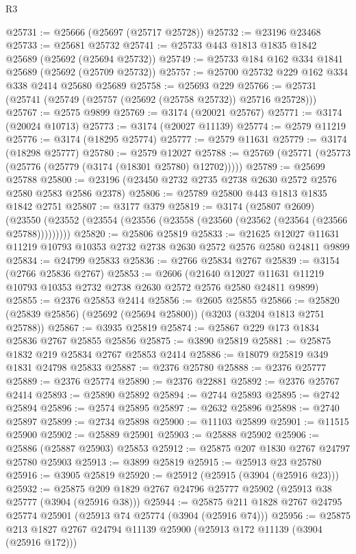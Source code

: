 \begin{lexlean}{R3}
\begin{coremodule}
@25731 := @25666 (@25697 (@25717 @25728))
@25732 := @23196 @23468
@25733 := @25681 @25732
@25741 := @25733 @443 @1813 @1835 @1842 @25689 (@25692 (@25694 @25732))
@25749 := @25733 @184 @162 @334 @1841 @25689 (@25692 (@25709 @25732))
@25757 := @25700 @25732 @229 @162 @334 @338 @2414 @25680 @25689
@25758 := @25693 @229
@25766 := @25731 (@25741 (@25749 (@25757 (@25692 (@25758 @25732)) @25716 @25728)))
@25767 := @2575 @9899
@25769 := @3174 (@20021 @25767)
@25771 := @3174 (@20024 @10713)
@25773 := @3174 (@20027 @11139)
@25774 := @2579 @11219
@25776 := @3174 (@18295 @25774)
@25777 := @2579 @11631
@25779 := @3174 (@18298 @25777)
@25780 := @2579 @12027
@25788 := @25769 (@25771 (@25773 (@25776 (@25779 (@3174 (@18301 @25780) @12702)))))
@25789 := @25699 @25788
@25800 := @23196 (@23450 @2732 @2735 @2738 @2630 @2572 @2576 @2580 @2583 @2586 @2378)
@25806 := @25789 @25800 @443 @1813 @1835 @1842 @2751
@25807 := @3177 @379
@25819 := @3174
    (@25807 @2609)
    (@23550 (@23552 (@23554 (@23556 (@23558 (@23560 (@23562 (@23564 (@23566 @25788)))))))))
@25820 := @25806 @25819
@25833 := @21625 @12027 @11631 @11219 @10793 @10353 @2732 @2738 @2630 @2572 @2576 @2580 @24811 @9899
@25834 := @24799 @25833
@25836 := @2766 @25834 @2767
@25839 := @3154 (@2766 @25836 @2767)
@25853 := @2606
    (@21640 @12027 @11631 @11219 @10793 @10353 @2732 @2738 @2630 @2572 @2576 @2580 @24811 @9899)
@25855 := @2376 @25853 @2414
@25856 := @2605 @25855
@25866 := @25820 (@25839 @25856) (@25692 (@25694 @25800)) (@3203 (@3204 @1813 @2751 @25788))
@25867 := @3935 @25819
@25874 := @25867 @229 @173 @1834 @25836 @2767 @25855 @25856
@25875 := @3890 @25819
@25881 := @25875 @1832 @219 @25834 @2767 @25853 @2414
@25886 := @18079 @25819 @349 @1831 @24798 @25833
@25887 := @2376 @25780
@25888 := @2376 @25777
@25889 := @2376 @25774
@25890 := @2376 @22881
@25892 := @2376 @25767 @2414
@25893 := @25890 @25892
@25894 := @2744 @25893
@25895 := @2742 @25894
@25896 := @2574 @25895
@25897 := @2632 @25896
@25898 := @2740 @25897
@25899 := @2734 @25898
@25900 := @11103 @25899
@25901 := @11515 @25900
@25902 := @25889 @25901
@25903 := @25888 @25902
@25906 := @25886 (@25887 @25903) @25853
@25912 := @25875 @207 @1830 @2767 @24797 @25780 @25903
@25913 := @3899 @25819
@25915 := @25913 @23 @25780
@25916 := @3905 @25819
@25920 := @25912 (@25915 (@3904 (@25916 @23)))
@25932 := @25875 @209 @1829 @2767 @24796 @25777 @25902 (@25913 @38 @25777 (@3904 (@25916 @38)))
@25944 := @25875 @211 @1828 @2767 @24795 @25774 @25901 (@25913 @74 @25774 (@3904 (@25916 @74)))
@25956 := @25875 @213 @1827 @2767 @24794 @11139 @25900 (@25913 @172 @11139 (@3904 (@25916 @172)))

\end{coremodule}
\end{lexlean}
